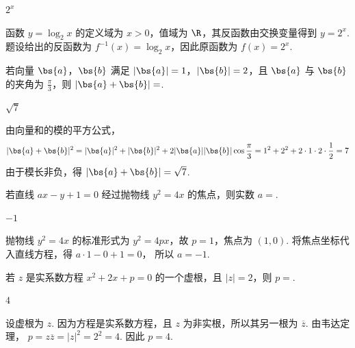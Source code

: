 \begin{answer}
\(2^x\)
\end{answer}

\begin{solution}
函数 \(y=\log_{2}x\) 的定义域为 \(x>0\)，值域为 \(\R\)，其反函数由交换变量得到 \(y=2^x\). 题设给出的反函数为 \(f^{-1}(x)=\log_{2}x\)，因此原函数为 \(f(x)=2^x\).
\end{solution}

\begin{problem}
若向量 \(\bs{a}\)，\(\bs{b}\) 满足 \(|\bs{a}| = 1\)，\(|\bs{b}| = 2\)，且 \(\bs{a}\) 与 \(\bs{b}\) 的夹角为 \(\frac{\pi}{3}\)，则 \(|\bs{a} + \bs{b}| = \)\fillinblank{}.
\end{problem}

\begin{answer}
\(\sqrt{7}\)
\end{answer}

\begin{solution}
由向量和的模的平方公式，
\[
|\bs{a}+\bs{b}|^2=|\bs{a}|^2+|\bs{b}|^2+2|\bs{a}||\bs{b}|\cos\frac{\pi}{3}=1^2+2^2+2\cdot1\cdot2\cdot\frac12=7
\]
由于模长非负，得 \(|\bs{a}+\bs{b}|=\sqrt7\).
\end{solution}

\begin{problem}
若直线 \(ax - y + 1 = 0\) 经过抛物线 \(y^{2} = 4x\) 的焦点，则实数 \(a = \)\fillinblank{}.
\end{problem}

\begin{answer}
\(-1\)
\end{answer}

\begin{solution}
抛物线 \(y^2=4x\) 的标准形式为 \(y^2=4px\)，故 \(p=1\)，焦点为 \((1,0)\). 将焦点坐标代入直线方程，得
\(a\cdot1-0+1=0\)，
所以 \(a=-1\).
\end{solution}

\begin{problem}
若 \(z\) 是实系数方程 \(x^{2} + 2x + p = 0\) 的一个虚根，且 \(|z| = 2\)，则 \(p = \)\fillinblank{}.
\end{problem}

\begin{answer}
\(4\)
\end{answer}

\begin{solution}
设虚根为 \(z\). 因为方程是实系数方程，且 \(z\) 为非实根，所以其另一根为 \(\overline{z}\). 由韦达定理，
\(p=z\overline{z}=|z|^2=2^2=4\).
因此 \(p=4\).
\end{solution}


